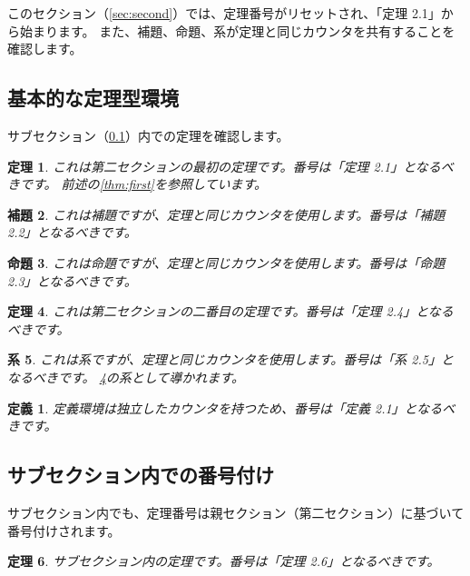 \documentclass[master]{kuisthesis}
\newtheorem{thm}{定理}[section]
\newtheorem{lem}[thm]{補題}        %
\newtheorem{prop}[thm]{命題}       %
\newtheorem{cor}[thm]{系}          %
\newtheorem{defn}{定義}[section]
\begin{document}
このセクション（\ref{sec:second}）では、定理番号がリセットされ、「定理 2.1」から始まります。
また、補題、命題、系が定理と同じカウンタを共有することを確認します。

\subsection{基本的な定理型環境}
\label{subsec:basic}

サブセクション（\ref{subsec:basic}）内での定理を確認します。

\begin{thm}\label{thm:third}
これは第二セクションの最初の定理です。番号は「定理 2.1」となるべきです。
前述の\ref{thm:first}を参照しています。
\end{thm}

\begin{lem}\label{lem:first}
これは補題ですが、定理と同じカウンタを使用します。番号は「補題 2.2」となるべきです。
\end{lem}

\begin{prop}\label{prop:first}
これは命題ですが、定理と同じカウンタを使用します。番号は「命題 2.3」となるべきです。
\end{prop}

\begin{thm}\label{thm:fourth}
これは第二セクションの二番目の定理です。番号は「定理 2.4」となるべきです。
\end{thm}

\begin{cor}\label{cor:first}
これは系ですが、定理と同じカウンタを使用します。番号は「系 2.5」となるべきです。
\ref{thm:fourth}の系として導かれます。
\end{cor}

\begin{defn}\label{defn:second}
定義環境は独立したカウンタを持つため、番号は「定義 2.1」となるべきです。
\end{defn}

\subsection{サブセクション内での番号付け}
\label{subsec:numbering}

サブセクション内でも、定理番号は親セクション（第二セクション）に基づいて番号付けされます。

\begin{thm}\label{thm:fifth}
サブセクション内の定理です。番号は「定理 2.6」となるべきです。
\end{thm}
\end{document}
